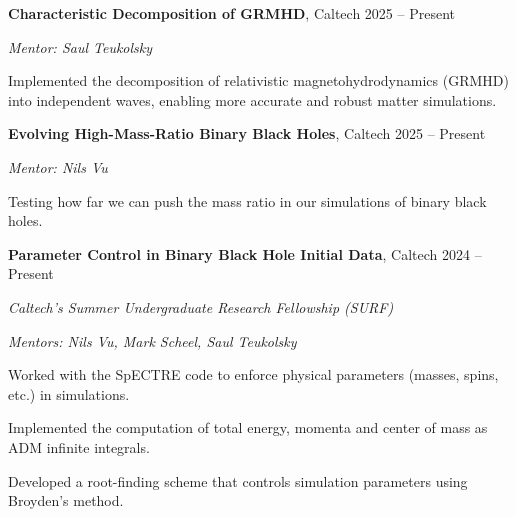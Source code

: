 \begin{entry}
	{{\bf Characteristic Decomposition of GRMHD}, Caltech}
	{2025 -- Present}
	
	{\em Mentor: Saul Teukolsky}

	Implemented the decomposition of relativistic magnetohydrodynamics (GRMHD) into independent waves, enabling more accurate and robust matter simulations.
\end{entry}

\vspace*{0.1cm}

\begin{entry}
	{{\bf Evolving High-Mass-Ratio Binary Black Holes}, Caltech}
	{2025 -- Present}
	
	{\em Mentor: Nils Vu}

	Testing how far we can push the mass ratio in our simulations of binary black holes.
\end{entry}

\vspace*{0.1cm}

\begin{entry}
	{{\bf Parameter Control in Binary Black Hole Initial Data}, Caltech}
	{2024 -- Present}
	
	{\em Caltech's Summer Undergraduate Research Fellowship (SURF)}

	{\em Mentors: Nils Vu, Mark Scheel, Saul Teukolsky}

	Worked with the SpECTRE code to enforce physical parameters (masses, spins, etc.) in simulations.

	Implemented the computation of total energy, momenta and center of mass as ADM infinite integrals.

	Developed a root-finding scheme that controls simulation parameters using Broyden's method.
\end{entry}
